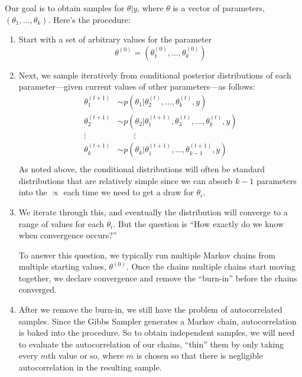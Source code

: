 \documentclass[12pt]{article}
\begin{document}
Our goal is to obtain samples for $\theta | y$, where $\theta$ 
is a vector of parameters, $(\theta_1, \ldots, \theta_k)$. Here's
the procedure:
\begin{enumerate}
   \item Start with a set of arbitrary values for the parameter 
      \[ \theta^{(0)} = (\theta_1^{(0)}, \ldots,  \theta_k^{(0)}) \]
   \item Next, we sample iteratively from conditional posterior 
      distributions of each parameter---given current values of
      other parameters---as follows:
      \begin{align*}
	 \theta_1^{(t+1)} &\sim p(\theta_1 | 
	    \theta_2^{(t)}, \ldots,  \theta_k^{(t)}, y)\\
	 \theta_2^{(t+1)} &\sim p(\theta_2 | 
	    \theta_1^{(t+1)},\theta_3^{(t)},\ldots,\theta_k^{(t)}, y)\\
	 \vdots \quad & \qquad \vdots \\
	 \theta_k^{(t+1)} &\sim p(\theta_k | 
	    \theta_1^{(t+1)},\ldots, \theta_{k-1}^{(t+1)}, y)\\
      \end{align*}
      As noted above, the conditional distributions will often be 
      standard distributions that are relatively simple since we
      can absorb $k-1$ parameters into the $\propto$ each time
      we need to get a draw for $\theta_i$.
   \item We iterate through this, and eventually the distribution will
      converge to a range of values for each $\theta_i$. But
      the question is ``How exactly do we know when convergence
      occurs?'' 
      
      To answer this question, we typically run multiple
      Markov chains from multiple starting values, $\theta^{(0)}$.
      Once the chains multiple chains start moving together, we declare
      convergence and remove the ``burn-in'' before the chains 
      converged.
   \item After we remove the burn-in, we still have the problem of
      autocorrelated samples.  Since the Gibbs Sampler generates
      a Markov chain, autocorrelation is baked into the procedure.
      So to obtain independent samples, we will need to evaluate the
      autocorrelation of our chains, ``thin'' them by only taking
      every $m$th value or so, where $m$ is chosen so that 
      there is negligible autocorrelation in the resulting sample.
\end{enumerate}
\end{document}

